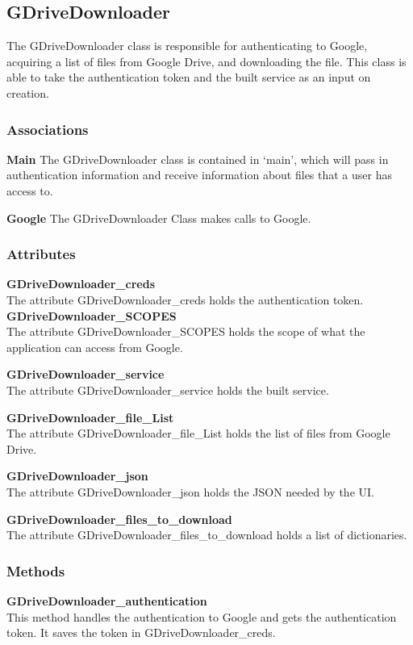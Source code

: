 \subsection{GDriveDownloader}
The GDriveDownloader class is responsible for authenticating to Google, acquiring a list of files from Google Drive, and downloading the file.
This class is able to take the authentication token and the built service as an input on creation.  
\subsubsection{Associations}
\textbf{Main} 
The GDriveDownloader class is contained in `main', which will pass in authentication information and receive information about files 
that a user has access to.

\textbf{Google} 
The GDriveDownloader Class makes calls to Google.

\subsubsection{Attributes}
\textbf{GDriveDownloader\_creds} \\
The attribute GDriveDownloader\_creds holds the authentication token.
\textbf{GDriveDownloader\_SCOPES} \\
The attribute GDriveDownloader\_SCOPES holds the scope of what the application can access from Google.

\textbf{GDriveDownloader\_service} \\
The attribute GDriveDownloader\_service holds the built service.

\textbf{GDriveDownloader\_file\_List} \\
The attribute GDriveDownloader\_file\_List holds the list of files from Google Drive.

\textbf{GDriveDownloader\_json} \\
The attribute GDriveDownloader\_json holds the JSON needed by the UI.

\textbf{GDriveDownloader\_files\_to\_download} \\
​The attribute GDriveDownloader\_files\_to\_download holds a list of dictionaries.
\subsubsection{Methods}
\textbf{GDriveDownloader\_authentication} \\
This method handles the authentication to Google and gets the authentication token. It saves the token in GDriveDownloader\_creds.

